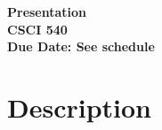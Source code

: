 \documentclass[a4paper, 11pt]{article}
\begin{document}
\noindent
\textbf{Presentation}\\
\textbf{CSCI 540} \\
\textbf{Due Date: See schedule}\\

\section*{Description}
\end{document}
